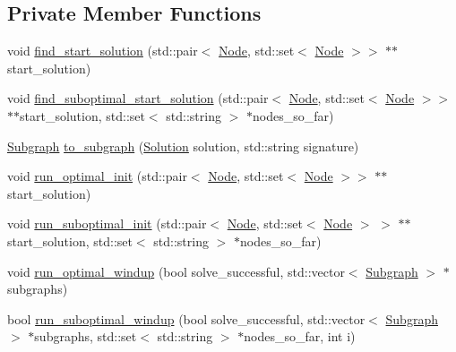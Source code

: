 \subsection*{Private Member Functions}
\begin{DoxyCompactItemize}
\item 
void \hyperlink{classderegnet_1_1DeregnetFinder_a9bca73c631c1ce679b07f1e0664abfa2}{find\+\_\+start\+\_\+solution} (std\+::pair$<$ \hyperlink{namespacederegnet_a744bad34f2de9856d36715a445f027f3}{Node}, std\+::set$<$ \hyperlink{namespacederegnet_a744bad34f2de9856d36715a445f027f3}{Node} $>$$>$ $\ast$$\ast$start\+\_\+solution)
\item 
void \hyperlink{classderegnet_1_1DeregnetFinder_a85fcde1dddbfd03ffc4ae8d244b4fc72}{find\+\_\+suboptimal\+\_\+start\+\_\+solution} (std\+::pair$<$ \hyperlink{namespacederegnet_a744bad34f2de9856d36715a445f027f3}{Node}, std\+::set$<$ \hyperlink{namespacederegnet_a744bad34f2de9856d36715a445f027f3}{Node} $>$$>$ $\ast$$\ast$start\+\_\+solution, std\+::set$<$ std\+::string $>$ $\ast$nodes\+\_\+so\+\_\+far)
\item 
\hyperlink{structderegnet_1_1Subgraph}{Subgraph} \hyperlink{classderegnet_1_1DeregnetFinder_a681d5e2506f9b6075ab36e742a360328}{to\+\_\+subgraph} (\hyperlink{structderegnet_1_1Solution}{Solution} solution, std\+::string signature)
\item 
void \hyperlink{classderegnet_1_1DeregnetFinder_ae0335349d6a60ee204d10bf8b7366cfa}{run\+\_\+optimal\+\_\+init} (std\+::pair$<$ \hyperlink{namespacederegnet_a744bad34f2de9856d36715a445f027f3}{Node}, std\+::set$<$ \hyperlink{namespacederegnet_a744bad34f2de9856d36715a445f027f3}{Node} $>$$>$ $\ast$$\ast$start\+\_\+solution)
\item 
void \hyperlink{classderegnet_1_1DeregnetFinder_ad996cee997a5db4e09016a6f725a6701}{run\+\_\+suboptimal\+\_\+init} (std\+::pair$<$ \hyperlink{namespacederegnet_a744bad34f2de9856d36715a445f027f3}{Node}, std\+::set$<$ \hyperlink{namespacederegnet_a744bad34f2de9856d36715a445f027f3}{Node} $>$ $>$ $\ast$$\ast$start\+\_\+solution, std\+::set$<$ std\+::string $>$ $\ast$nodes\+\_\+so\+\_\+far)
\item 
void \hyperlink{classderegnet_1_1DeregnetFinder_a92610c1444ba271820e64d224ec64bb7}{run\+\_\+optimal\+\_\+windup} (bool solve\+\_\+successful, std\+::vector$<$ \hyperlink{structderegnet_1_1Subgraph}{Subgraph} $>$ $\ast$subgraphs)
\item 
bool \hyperlink{classderegnet_1_1DeregnetFinder_a4021d92d787877187a24dcbaf0c1bad1}{run\+\_\+suboptimal\+\_\+windup} (bool solve\+\_\+successful, std\+::vector$<$ \hyperlink{structderegnet_1_1Subgraph}{Subgraph} $>$ $\ast$subgraphs, std\+::set$<$ std\+::string $>$ $\ast$nodes\+\_\+so\+\_\+far, int i)
$$
\end{DoxyCompactItemize}
